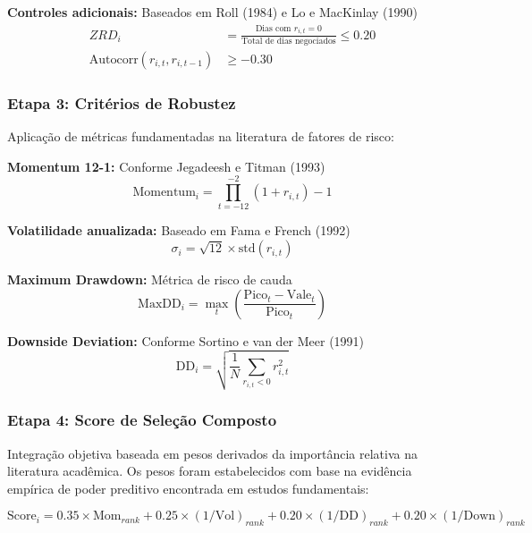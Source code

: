 \textbf{Controles adicionais:} Baseados em Roll (1984) e Lo e MacKinlay (1990)
\begin{align}
ZRD_i &= \frac{\text{Dias com } r_{i,t} = 0}{\text{Total de dias negociados}} \leq 0.20 \\
\text{Autocorr}(r_{i,t}, r_{i,t-1}) &\geq -0.30
\end{align}

\subsubsection{Etapa 3: Critérios de Robustez}

Aplicação de métricas fundamentadas na literatura de fatores de risco:

\textbf{Momentum 12-1:} Conforme Jegadeesh e Titman (1993)
\begin{equation}
\text{Momentum}_{i} = \prod_{t=-12}^{-2}(1 + r_{i,t}) - 1
\end{equation}

\textbf{Volatilidade anualizada:} Baseado em Fama e French (1992)
\begin{equation}
\sigma_{i} = \sqrt{12} \times \text{std}(r_{i,t})
\end{equation}

\textbf{Maximum Drawdown:} Métrica de risco de cauda
\begin{equation}
\text{MaxDD}_i = \max_{t} \left( \frac{\text{Pico}_{t} - \text{Vale}_{t}}{\text{Pico}_{t}} \right)
\end{equation}

\textbf{Downside Deviation:} Conforme Sortino e van der Meer (1991)
\begin{equation}
\text{DD}_i = \sqrt{\frac{1}{N} \sum_{r_{i,t} < 0} r_{i,t}^2}
\end{equation}

\subsubsection{Etapa 4: Score de Seleção Composto}

Integração objetiva baseada em pesos derivados da importância relativa na literatura acadêmica. Os pesos foram estabelecidos com base na evidência empírica de poder preditivo encontrada em estudos fundamentais:

\begin{equation}
\text{Score}_i = 0.35 \times \text{Mom}_{rank} + 0.25 \times (1/\text{Vol})_{rank} + 0.20 \times (1/\text{DD})_{rank} + 0.20 \times (1/\text{Down})_{rank}
\end{equation}

